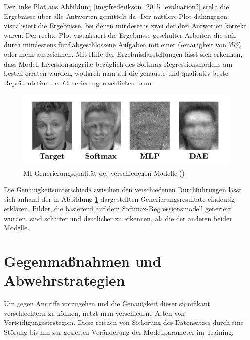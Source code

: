 Der linke Plot aus Abbildung \ref{img:frederikson_2015_evaluation2} stellt die Ergebnisse über alle Antworten gemittelt da. Der mittlere Plot dahingegen visualisiert die Ergebnisse, bei denen mindestens zwei der drei Antworten korrekt waren. Der rechte Plot visualisiert die Ergebnisse geschulter Arbeiter, die sich durch mindestens fünf abgeschlossene Aufgaben mit einer Genauigkeit von 75\% oder mehr auszeichnen.
Mit Hilfe der Ergebnisdarstellungen lässt sich erkennen, dass Modell-Inversionsangriffe bezüglich des Softmax-Regressionsmodells am besten erraten wurden, wodurch man auf die genauste und qualitativ beste Repräsentation der Generierungen schließen kann. 
\begin{figure}[H]
	\centering
	\includegraphics[width=0.8\linewidth]{Bilder/frederikson_2015_3.png}
	\caption{MI-Generierungsqualität der verschiedenen Modelle (\cite[S. 10, Figure 10]{fredrikson_model_2015})}
	\label{img:frederikson_2015_evaluation3}
\end{figure}
Die Genauigkeitsunterschiede zwischen den verschiedenen Durchführungen lässt sich anhand der in Abbildung \ref{img:frederikson_2015_evaluation3} dargestellten Generierungsresultate eindeutig erklären. Bilder, die basierend auf dem Softmax-Regressionsmodell generiert wurden, sind schärfer und deutlicher zu erkennen, als die der anderen beiden Modelle.
\section{Gegenmaßnahmen und Abwehrstrategien}\label{chpt:DefenseMI}
Um gegen Angriffe vorzugehen und die Genauigkeit dieser signifikant verschlechtern zu können, nutzt man verschiedene Arten von Verteidigungsstrategien. Diese reichen von Sicherung des Datensatzes durch eine Störung bis hin zur gezielten Veränderung der Modellparameter im Training. 


